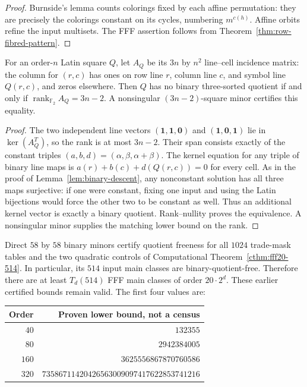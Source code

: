 \begin{proof}
Burnside's lemma counts colorings fixed by each affine permutation:
they are precisely the colorings constant on its cycles, numbering
$m^{c(h)}$. Affine orbits refine the input multisets. The FFF
assertion follows from Theorem~\ref{thm:row-fibred-pattern}.
\end{proof}

\begin{lemma}
\label{lem:binary-rank-certificate}
For an order-$n$ Latin square $Q$, let $A_Q$ be its $3n$ by $n^2$
line--cell incidence matrix: the column for $(r,c)$ has ones on row line
$r$, column line $c$, and symbol line $Q(r,c)$, and zeros elsewhere.
Then $Q$ has no binary three-sorted quotient if and only if
$\operatorname{rank}_{\mathbb F_2} A_Q=3n-2$.
A nonsingular $(3n-2)$-square minor certifies this equality.
\end{lemma}

\begin{proof}
The two independent line vectors $(\mathbf1,\mathbf1,\mathbf0)$ and
$(\mathbf1,\mathbf0,\mathbf1)$ lie in $\ker(A_Q^T)$, so the rank is
at most $3n-2$. Their span consists exactly of the constant triples
$(a,b,d)=(\alpha,\beta,\alpha+\beta)$.
The kernel equation for any triple of binary line maps is
$a(r)+b(c)+d(Q(r,c))=0$ for every cell. As in the proof of
Lemma~\ref{lem:binary-descent}, any nonconstant solution has all three
maps surjective: if one were constant, fixing one input and using the
Latin bijections would force the other two to be constant as well.
Thus an additional kernel vector is exactly a binary quotient.
Rank--nullity proves the equivalence. A nonsingular minor supplies the
matching lower bound on the rank.
\end{proof}

\begin{computationaltheorem}
\label{cthm:dyadic-fff20-bound}
Direct $58$ by $58$ binary minors certify quotient freeness for all
$1024$ trade-mask tables and the two quadratic controls of Computational
Theorem~\ref{cthm:fff20-514}. In particular, its $514$ input main classes
are binary-quotient-free. Therefore
there are at least $T_d(514)$ FFF main classes of order $20\cdot2^d$.
These earlier certified bounds remain valid. The first four values are:
\begin{center}
\begin{tabular}{rr}
\toprule
Order & Proven lower bound, not a census\\
\midrule
$40$ & $132355$\\
$80$ & $2942384005$\\
$160$ & $3625556867870760586$\\
$320$ & $73586711420426563009097417622853741216$\\
\bottomrule
\end{tabular}
\end{center}
\end{computationaltheorem}

